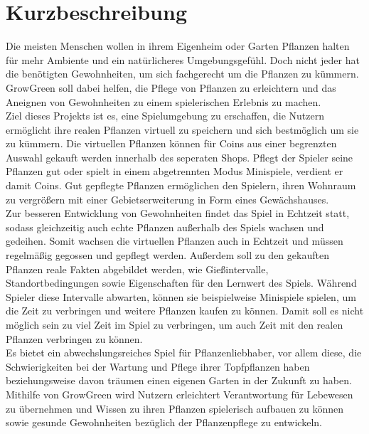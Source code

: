 \chapter{Kurzbeschreibung}\label{ch:kurzbeschreibung}
Die meisten Menschen wollen in ihrem Eigenheim oder Garten Pflanzen halten für mehr Ambiente und ein natürlicheres 
Umgebungsgefühl. 
Doch nicht jeder hat die benötigten Gewohnheiten, um sich fachgerecht um die Pflanzen zu kümmern.
GrowGreen soll dabei helfen, die Pflege von Pflanzen zu erleichtern und das Aneignen von Gewohnheiten 
zu einem spielerischen Erlebnis zu machen.\\[7pt]
Ziel dieses Projekts ist es, eine Spielumgebung zu erschaffen, die Nutzern ermöglicht ihre realen Pflanzen virtuell zu speichern 
und sich bestmöglich um sie zu kümmern. 
Die virtuellen Pflanzen können für Coins aus einer begrenzten Auswahl gekauft werden innerhalb des seperaten Shops. 
Pflegt der Spieler seine Pflanzen gut oder spielt in einem abgetrennten Modus Minispiele, verdient er damit Coins. 
Gut gepflegte Pflanzen ermöglichen den Spielern, ihren Wohnraum zu vergrößern mit einer Gebietserweiterung in Form eines
Gewächshauses.\\[7pt]
Zur besseren Entwicklung von Gewohnheiten findet das Spiel in Echtzeit statt, sodass gleichzeitig auch echte Pflanzen
außerhalb des Spiels wachsen und gedeihen.
Somit wachsen die virtuellen Pflanzen auch in Echtzeit und müssen regelmäßig gegossen und gepflegt werden.
Außerdem soll zu den gekauften Pflanzen reale Fakten abgebildet werden, wie Gießintervalle, Standortbedingungen 
sowie Eigenschaften für den Lernwert des Spiels. 
Während Spieler diese Intervalle abwarten, können sie beispielweise Minispiele spielen, um die Zeit zu verbringen und 
weitere Pflanzen kaufen zu können. 
Damit soll es nicht möglich sein zu viel Zeit im Spiel zu verbringen, um auch Zeit mit den realen Pflanzen 
verbringen zu können.\\[7pt]
Es bietet ein abwechslungsreiches Spiel für Pflanzenliebhaber, vor allem diese, die Schwierigkeiten bei der Wartung und 
Pflege ihrer Topfpflanzen haben beziehungsweise davon träumen einen eigenen Garten in der Zukunft zu haben. 
Mithilfe von GrowGreen wird Nutzern erleichtert Verantwortung für Lebewesen zu übernehmen und Wissen zu ihren Pflanzen 
spielerisch aufbauen zu können sowie gesunde Gewohnheiten bezüglich der Pflanzenpflege zu entwickeln.\\[7pt]
